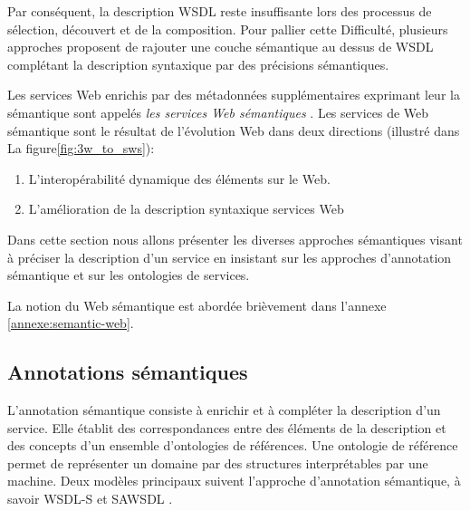 Par conséquent, la description \textsc{WSDL} reste insuffisante lors
des processus de sélection, découvert et de la composition. Pour
pallier cette Difficulté, plusieurs approches
\cite{sivashanmugam2003adding,mcilraith2001semantic,
  mcilraith2003bringing, fensel2002web} proposent de rajouter une
couche sémantique au dessus de \textsc{WSDL} complétant la description
syntaxique par des précisions sémantiques.



Les services Web enrichis par des métadonnées supplémentaires
exprimant leur la sémantique sont appelés \textit{les services Web
sémantiques} \cite{fensel2002semantic, mcilraith2001semantic}. Les
services de Web sémantique sont le résultat de l'évolution Web dans
deux directions \cite{bartalos2011effective} (illustré dans La
figure\ref{fig:3w_to_sws}):

\begin{enumerate}
  \item L'interopérabilité dynamique des éléments sur le Web.
  \item L'amélioration de la description syntaxique services Web
\end{enumerate}

Dans cette section nous allons présenter les diverses approches
sémantiques visant à préciser la description d'un service en insistant
sur les approches d'annotation sémantique et sur les ontologies de
services.

La notion du Web sémantique est abordée brièvement dans l'annexe
\ref{annexe:semantic-web}.

  \subsection{Annotations sémantiques}
  \label{sec:semantic-annot}

  L'annotation sémantique consiste à enrichir et à compléter la
  description d'un service. Elle établit des correspondances entre des
  éléments de la description et des concepts d'un ensemble
  d'ontologies de références. Une ontologie de référence permet de
  représenter un domaine par des structures interprétables par une
  machine. Deux modèles principaux suivent l'approche d'annotation
  sémantique, à savoir \textsc{WSDL-S} et \textsc{SAWSDL}
  \cite{elie2010}.


